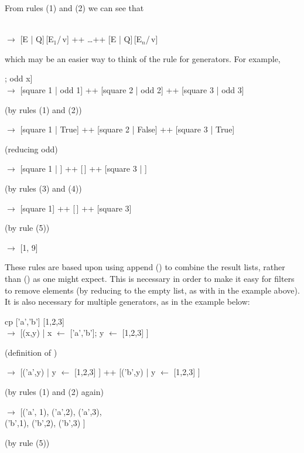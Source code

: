 From rules (1) and (2) we can see that
\begin{mlcoded}
     \quad {[E | v $\leftarrow$ {[E$_1$, \ldots, E$_n$]}; Q]} \\
     $\rightarrow$ {[E | Q]\,[E$_1$/\,v]} ++ \ldots ++ {[E | Q]}\,{[E$_n$/\,v]}
\end{mlcoded}



which may be an easier way to think of the rule for generators. For example,
\begin{mlcoded}
    [square x | x $\leftarrow$ [1, 2, 3]; odd x] \\
    \phantom{w} $\rightarrow$ [square 1 | odd 1] ++ [square 2 | odd 2] ++ [square 3 | odd 3]
\end{mlcoded}
\hfill (by rules (1) and (2))
\begin{mlcoded}
        \phantom{w} $\rightarrow$ [square 1 | True] ++ [square 2 | False] ++ [square 3 | True]
\end{mlcoded}
\hfill (reducing odd)
\begin{mlcoded}
        \phantom{w} $\rightarrow$ [square 1 | ] ++ [\,] ++ [square 3 | ]
\end{mlcoded}
\hfill (by rules (3) and (4))
\begin{mlcoded}
        \phantom{w} $\rightarrow$ [square 1] ++ [\,] ++ [square 3]
\end{mlcoded}
\hfill (by rule (5))
\begin{mlcoded}
        \phantom{w} $\rightarrow$  [1, 9]
\end{mlcoded}

\noindent
These rules are based upon using append (\ml{++}) to combine the result lists,
rather than  (\ml{:}) as one might expect. This is necessary in order to make it
easy for filters to remove elements (by reducing to the empty list, as with
in the example above). It is also necessary for multiple
generators, as in the example below:
\begin{mlcoded}
    cp ['a','b'] [1,2,3]\\
        \phantom{w} $\rightarrow$ [(x,y) | x $\leftarrow$ ['a','b']; y $\leftarrow$ [1,2,3] ]
\end{mlcoded}
\hfill (definition of )
\begin{mlcoded}
        \phantom{w} $\rightarrow$  [('a',y) | y $\leftarrow$ [1,2,3] ] ++ [('b',y) | y $\leftarrow$ [1,2,3] ]
\end{mlcoded}
\hfill (by rules (1) and (2) again)
\begin{mlcoded}
        \phantom{w} $\rightarrow$ [('a', 1), ('a',2), ('a',3), \\
        \phantom{w $\rightarrow$ [}('b',1), ('b',2), ('b',3) ]
\end{mlcoded}
\hfill (by rule (5))

